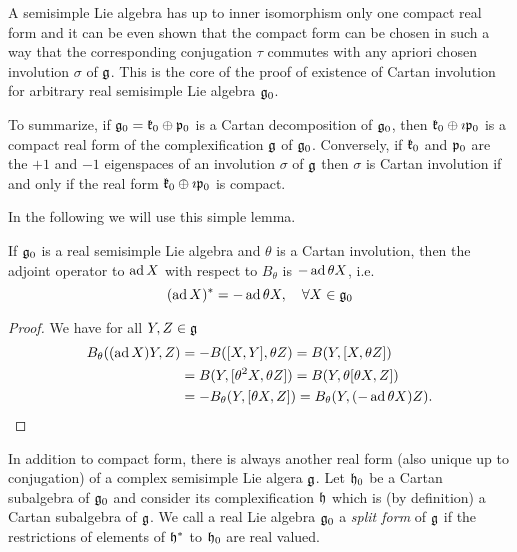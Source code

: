 A semisimple Lie algebra has up to inner isomorphism only one compact real form and it can be even shown that the compact form can be chosen in such a way that the corresponding conjugation $\tau$ commutes with any apriori chosen involution $\sigma$ of $\mathfrak{g}$. This is the core of the proof of existence of Cartan involution for arbitrary real semisimple Lie algebra $\mathfrak{g}_0$.

To summarize, if $\mathfrak{g}_0 = \mathfrak{k}_0 \oplus \mathfrak{p}_0$ is a Cartan decomposition of $\mathfrak{g}_0$, then $\mathfrak{k}_0 \oplus \imath \mathfrak{p}_0$ is a compact  real form of the complexification $\mathfrak{g}$ of $\mathfrak{g}_0$. Conversely, if $\mathfrak{k}_0$ and $\mathfrak{p}_0$ are the $+1$ and $-1$ eigenspaces of an involution $\sigma$ of $\mathfrak{g}$ then $\sigma$ is Cartan involution if and only if the real form $\mathfrak{k}_0 \oplus \imath \mathfrak{p}_0$  is compact.

In the following we will use this simple lemma.
\begin{lemma}\label{lem:theta_adjoint}
 If $\mathfrak{g}_0$ is a real semisimple Lie algebra and $\theta$ is a Cartan involution, then the adjoint operator to $\operatorname{\mathrm{ad}} X$ with respect to $B_\theta$ is $-\operatorname{\mathrm{ad}} \theta X$, i.e.
 \begin{equation*}
  (\operatorname{\mathrm{ad}} X)^* = -\operatorname{\mathrm{ad}} \theta X, \quad \forall X\in\mathfrak{g}_0
 \end{equation*}
\end{lemma}
\begin{proof}
  We have for all $Y,Z\in\mathfrak{g}$
  \begin{align*}
  B_\theta((\operatorname{\mathrm{ad}} X)Y,Z) &= -B([X,Y],\theta Z) = B(Y,[X,\theta Z]) \\
                       &= B(Y,[\theta^2 X, \theta Z]) = B(Y,\theta [\theta X, Z]) \\
		       &= -B_\theta(Y,[\theta X,Z]) = B_\theta(Y,(-\operatorname{\mathrm{ad}} \theta X)Z).
  \end{align*}
\end{proof}

In addition to compact form, there is always another real form (also unique up to conjugation) of a complex semisimple Lie algera $\mathfrak{g}$. Let $\mathfrak{h}_0$ be a Cartan subalgebra of $\mathfrak{g}_0$ and consider its complexification $\mathfrak{h}$ which is (by definition) a Cartan subalgebra of $\mathfrak{g}$. We call a real Lie algebra $\mathfrak{g}_0$ a \emph{split form} of $\mathfrak{g}$ if the restrictions of elements of $\mathfrak{h}^*$ to $\mathfrak{h}_0$ are real valued.

